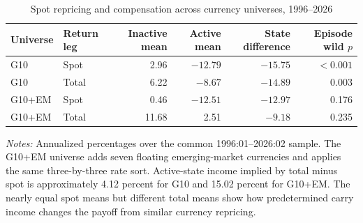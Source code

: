 \begin{table}[H]
\centering
\caption{Spot repricing and compensation across currency universes, 1996--2026}
\label{tab:g10-em-compensation}
\small
\begin{tabular}{llrrrr}
\toprule
Universe & Return leg & Inactive mean & Active mean & State difference & Episode wild $p$ \\
\midrule
G10 & Spot & 2.96 & $-12.79$ & $-15.75$ & $<0.001$ \\
G10 & Total & 6.22 & $-8.67$ & $-14.89$ & 0.003 \\
G10+EM & Spot & 0.46 & $-12.51$ & $-12.97$ & 0.176 \\
G10+EM & Total & 11.68 & 2.51 & $-9.18$ & 0.235 \\
\bottomrule
\end{tabular}

\begin{minipage}{0.94\textwidth}
\footnotesize\emph{Notes:} Annualized percentages over the common 1996:01--2026:02 sample. The G10+EM universe adds seven floating emerging-market currencies and applies the same three-by-three rate sort. Active-state income implied by total minus spot is approximately 4.12 percent for G10 and 15.02 percent for G10+EM. The nearly equal spot means but different total means show how predetermined carry income changes the payoff from similar currency repricing.
\end{minipage}
\end{table}
